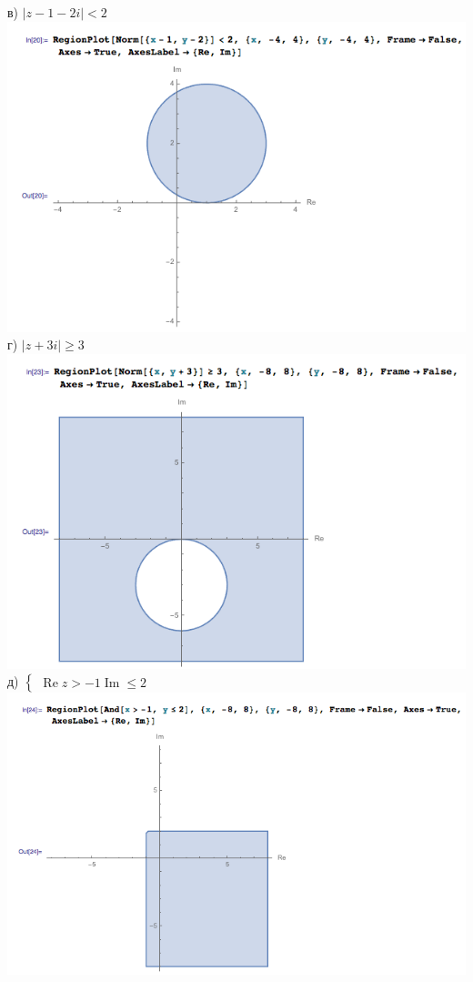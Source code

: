 в) $ |z - 1 - 2i| < 2 $
\\
\includegraphics[scale=0.6]{task/2_10/screen3.png}
\\
г) $ |z + 3i| \geq 3 $
\\
\includegraphics[scale=0.6]{task/2_10/screen4.png}
\\
д)
$
	\begin{cases}
		\operatorname{Re} z > -1
		\operatorname{Im} \leq 2
	\end{cases}
$
\\
\includegraphics[scale=0.6]{task/2_10/screen5.png}
